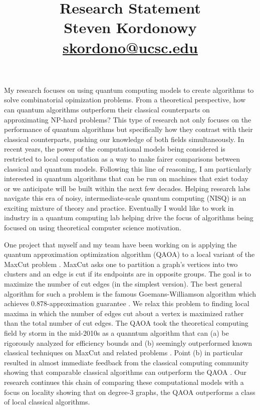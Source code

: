 \documentclass{article}
\makeatletter
\renewcommand{\maketitle}{\bgroup\setlength{\parindent}{0pt}
\begin{flushleft}
  \textbf{\@title}

  \@author
\end{flushleft}\egroup
}
\makeatother
\begin{document}
 \title{Research Statement\\Steven Kordonowy\\\href{mailto:skordono@ucsc.edu}{skordono@ucsc.edu} }
 \date{}
 \maketitle

My research focuses on using quantum computing models to create algorithms to solve combinatorial opimization problems. From a theoretical perspective, how can quantum algorithms outperform their classical counterparts on approximating NP-hard problems? This type of research not only focuses on the performance of quantum algorithms but specifically how they contrast with their classical counterparts, pushing our knowledge of both fields simultaneously. In recent years, the power of the computational models being considered is restricted to local computation as a way to make fairer comparisons between classical and quantum models. Following this line of reasoning, I am particularly interested in quantum algorithms that can be run on machines that exist today or we anticipate will be built within the next few decades. Helping research labs navigate this era of noisy, intermediate-scale quantum computing (NISQ) is an exciting mixture of theory and practice. Eventually I would like to work in industry in a quantum computing lab helping drive the focus of algorithms being focused on using theoretical computer science motivation.

One project that myself and my team have been working on is applying the quantum approximation optimization algorithm (QAOA) to a local variant of the MaxCut problem \cite{LMC}.  MaxCut asks one to partition a graph's vertices into two clusters and an edge is cut if its endpoints are in opposite groups. The goal is to maximize the number of cut edges (in the simplest version). The best general algorithm for such a problem is the famous Goemans-Williamson algorithm which achieves 0.878-approximation guarantee \cite{goewim}. We relax this problem to finding local maxima in which the number of edges cut about a vertex is maximized rather than the total number of cut edges. The QAOA took the theoretical computing field by storm in the mid-2010s as a quanntum algorithm that can (a) be rigorously analyzed for efficiency bounds and (b) seemingly outperformed known classical techniques on MaxCut and related problems \cite{FGG, FGG2}. Point (b) in particular resulted in almost immediate feedback from the classical computing community showing that comparable classical algorithms can outperform the QAOA \cite{threshold, barak_etal, hastings2019classical}. Our research continues this chain of comparing these computational models with a focus on locality showing that on degree-3 graphs, the QAOA outperforms a class of local classical algorithms.
\end{document}
